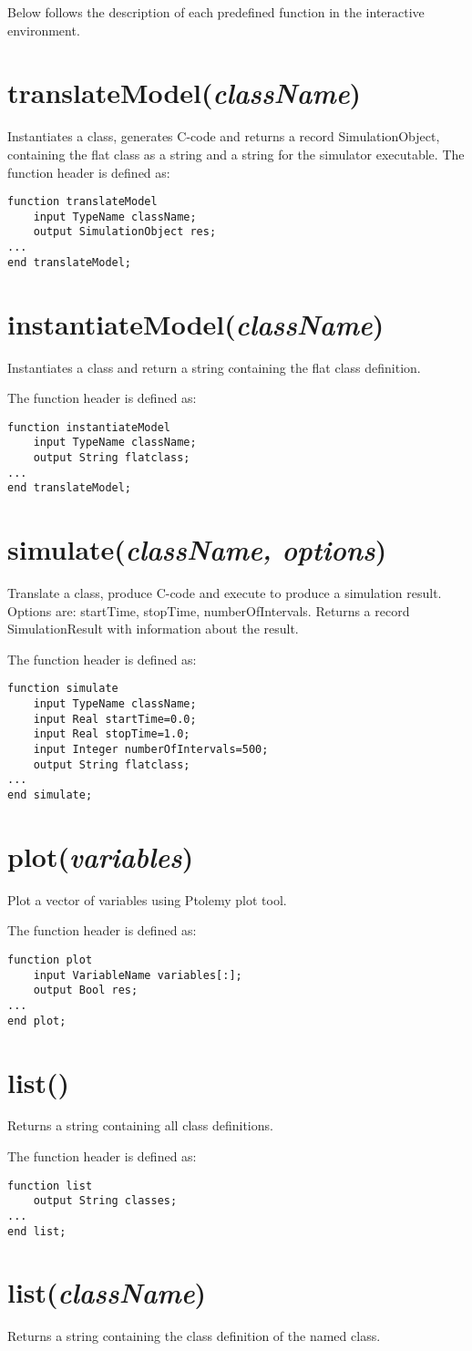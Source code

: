 \documentclass{report}
\newcommand{\func}[1]{\section{#1}}
\newcommand{\funcbegin}{}
\begin{document}
Below follows the description of each predefined function in the
interactive environment.
\funcbegin
\func{translateModel(\emph{className})}
Instantiates a class, generates C-code and returns a record
SimulationObject, containing the flat class as a string and a string
for the simulator executable. 
The function header is defined as:
\begin{verbatim}
function translateModel
    input TypeName className;
    output SimulationObject res;
...
end translateModel;
\end{verbatim}

\func{instantiateModel(\emph{className})}
Instantiates a class and return a string
containing the flat class definition. 

The function header is defined as:
\begin{verbatim}
function instantiateModel
    input TypeName className;
    output String flatclass;
...
end translateModel;
\end{verbatim}

\func{simulate(\emph{className, options})}
Translate a class, produce C-code and execute to produce a simulation result.
Options are: startTime, stopTime, numberOfIntervals.
Returns a record SimulationResult with information about the result.

The function header is defined as:
\begin{verbatim}
function simulate
    input TypeName className;
    input Real startTime=0.0;
    input Real stopTime=1.0;
    input Integer numberOfIntervals=500;	
    output String flatclass;
...
end simulate;
\end{verbatim}

\func{plot(\emph{variables})}
Plot a vector of variables using Ptolemy plot tool.

The function header is defined as:
\begin{verbatim}
function plot
    input VariableName variables[:];
    output Bool res;
...
end plot;
\end{verbatim}

\func{list()}
Returns a string containing all class definitions.

The function header is defined as:
\begin{verbatim}
function list
    output String classes;
...
end list;
\end{verbatim}

\func{list(\emph{className})}
Returns a string containing the class definition of
the named class.
\end{document}
